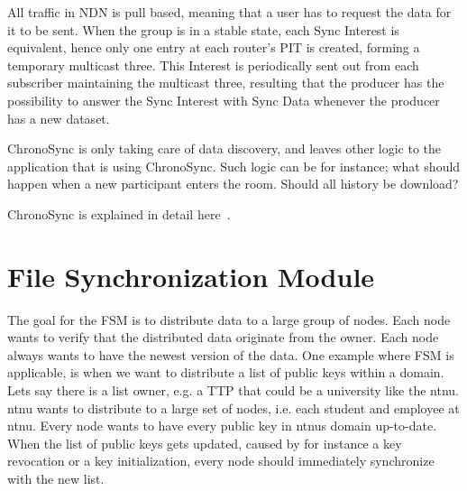 All traffic in \gls{NDN} is pull based, meaning that a user has to request the data for it to be sent. 
When the group is in a stable state, each Sync Interest is equivalent, hence only one entry at each router's \gls{PIT} is created, forming a temporary multicast three.
This Interest is periodically sent out from each subscriber maintaining the multicast three, resulting that the producer has the possibility to answer the Sync Interest with Sync Data whenever the producer has a new dataset.

ChronoSync is only taking care of data discovery, and leaves other logic to the application that is using ChronoSync. 
Such logic can be for instance; what should happen when a new participant enters the room.
Should all history be download?


ChronoSync is explained in detail here~\cite{DBLP:conf/icnp/ZhuA13}.

\section{File Synchronization Module}\label{file-sync}
The goal for the \gls{FSM} is to distribute data to a large group of nodes.
Each node wants to verify that the distributed data originate from the owner.
Each node always wants to have the newest version of the data. 
One example where \gls{FSM} is applicable, is when we want to distribute a list of public keys within a domain.
Lets say there is a list owner, e.g. a \gls{TTP} that could be a university like the \gls{ntnu}.
\gls{ntnu} wants to distribute to a large set of nodes, i.e. each student and employee at \gls{ntnu}.
Every node wants to have every public key in \gls{ntnu}s domain up-to-date.
When the list of public keys gets updated, caused by for instance a key revocation or a key initialization, every node should immediately synchronize with the new list.

